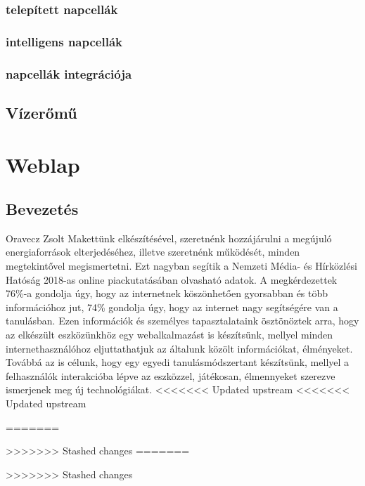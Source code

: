 \documentclass[
]{thesis-ekf}
\theoremstyle{definition}
\theoremstyle{remark}
\begin{document}
 		\subsection{telepített napcellák}
 		\subsection{intelligens napcellák}
 		\subsection{napcellák integrációja}
 	\section{Vízerőmű}
 	
 	

	
	
		

\chapter{Weblap}
	\section{Bevezetés}
	Oravecz Zsolt
		Makettünk elkészítésével, szeretnénk hozzájárulni a megújuló energiaforrások elterjedéséhez, illetve szeretnénk működését, minden megtekintővel megismertetni. Ezt nagyban segítik a Nemzeti Média- és Hírközlési Hatóság 2018-as online piackutatásában olvasható adatok. A megkérdezettek 76\%-a gondolja úgy, hogy az internetnek köszönhetően gyorsabban és több információhoz jut, 74\% gondolja úgy, hogy az internet nagy segítségére van a tanulásban. \cite{NMHHlakossagi}  Ezen információk és személyes tapasztalataink ösztönöztek arra, hogy az elkészült eszközünkhöz egy webalkalmazást is készítsünk, mellyel minden internethasználóhoz eljuttathatjuk az általunk közölt információkat, élményeket. Továbbá az is célunk, hogy egy egyedi tanulásmódszertant készítsünk, mellyel a felhasználók interakcióba lépve az eszközzel, játékosan, élmennyeket szerezve ismerjenek meg új technológiákat. 
<<<<<<< Updated upstream
<<<<<<< Updated upstream
		
		
=======
		
		
>>>>>>> Stashed changes
=======
		
		
>>>>>>> Stashed changes
\end{document}

